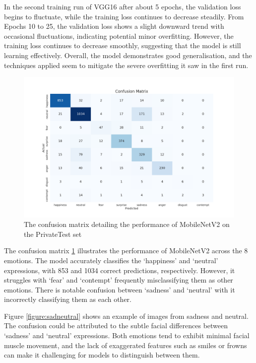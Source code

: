In the second training run of VGG16 after about 5 epochs, the validation loss begins to fluctuate, while the training loss continues to decrease steadily. From Epochs 10 to 25, the validation loss shows a slight downward trend with occasional fluctuations, indicating potential minor overfitting. However, the training loss continues to decrease smoothly, suggesting that the model is still learning effectively. Overall, the model demonstrates good generalisation, and the techniques applied seem to mitigate the severe overfitting it saw in the first run.

\begin{figure}[H]
    \centering{}
    \includegraphics[scale=0.38]{fed_images/conf_matrix_MobileNetv2.png}
    \caption{The confusion matrix detailing the performance of MobileNetV2 on the PrivateTest set}
    \label{figure:conf_mnv2}
\end{figure}

The confusion matrix \ref{figure:conf_mnv2} illustrates the performance of MobileNetV2 across the 8 emotions. The model accurately classifies the `happiness' and `neutral' expressions, with 853 and 1034 correct predictions, respectively. However, it struggles with `fear' and `contempt' frequently misclassifying them as other emotions. There is notable confusion between `sadness' and `neutral' with it incorrectly classifying them as each other.

Figure \ref{figure:sadneutral} shows an example of images from sadness and neutral. The confusion could be attributed to the subtle facial differences between `sadness' and `neutral' expressions. Both emotions tend to exhibit minimal facial muscle movement, and the lack of exaggerated features such as smiles or frowns can make it challenging for models to distinguish between them.

